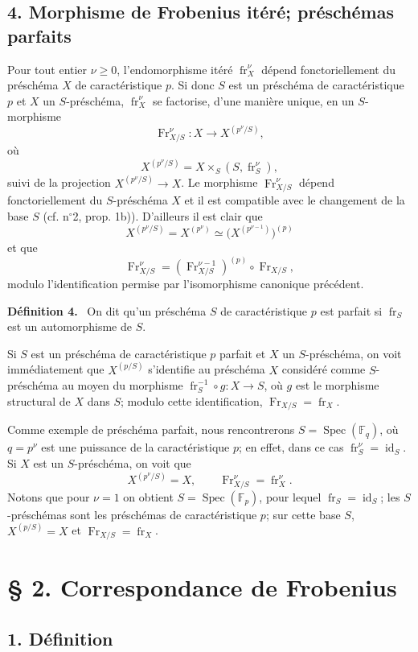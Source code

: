 \documentclass[11pt]{article}
\newenvironment{statement}[1]{\par\medskip\noindent\textbf{#1.}\ }{\par\medskip}
\DeclareMathOperator{\Spec}{Spec}
\providecommand{\id}{\operatorname{id}}
\providecommand{\id}{\operatorname{id}}
\providecommand{\id}{\operatorname{id}}
\providecommand{\id}{\operatorname{id}}
\providecommand{\Spec}{\operatorname{Spec}}
\providecommand{\Spec}{\operatorname{Spec}}
\providecommand{\id}{\operatorname{id}}
\providecommand{\Spec}{\operatorname{Spec}}
\providecommand{\fr}{\operatorname{fr}}
\providecommand{\Fr}{\operatorname{Fr}}
\providecommand{\Fr}{\operatorname{Fr}}
\providecommand{\fr}{\operatorname{fr}}
\providecommand{\Spec}{\operatorname{Spec}}
\providecommand{\id}{\operatorname{id}}
\begin{document}
\subsection*{4. Morphisme de Frobenius itéré; préschémas parfaits}

Pour tout entier $\nu\geq 0$, l'endomorphisme itéré $\fr_X^\nu$ dépend fonctoriellement du préschéma $X$ de caractéristique $p$. Si donc $S$ est un préschéma de caractéristique $p$ et $X$ un $S$-préschéma, $\fr_X^\nu$ se factorise, d'une manière unique, en un $S$-morphisme
\[
\Fr_{X/S}^\nu:X\longrightarrow X^{(p^\nu/S)},
\]
où
\[
X^{(p^\nu/S)}=X\times_S(S,\fr_S^\nu),
\]
suivi de la projection $X^{(p^\nu/S)}\to X$. Le morphisme $\Fr_{X/S}^\nu$ dépend fonctoriellement du $S$-préschéma $X$ et il est compatible avec le changement de la base $S$ (cf. n$^\circ$2, prop. 1b)). D'ailleurs il est clair que
\[
X^{(p^\nu/S)}=X^{(p^\nu)}\simeq\bigl(X^{(p^{\nu-1})}\bigr)^{(p)}
\]
et que
\[
\Fr_{X/S}^\nu=(\Fr_{X/S}^{\nu-1})^{(p)}\circ\Fr_{X/S},
\]
modulo l'identification permise par l'isomorphisme canonique précédent.

\begin{statement}{Définition 4}
On dit qu'un préschéma $S$ de caractéristique $p$ est parfait si $\fr_S$ est un automorphisme de $S$.
\end{statement}

Si $S$ est un préschéma de caractéristique $p$ parfait et $X$ un $S$-préschéma, on voit immédiatement que $X^{(p/S)}$ s'identifie au préschéma $X$ considéré comme $S$-préschéma au moyen du morphisme $\fr_S^{-1}\circ g:X\to S$, où $g$ est le morphisme structural de $X$ dans $S$; modulo cette identification, $\Fr_{X/S}=\fr_X$.

Comme exemple de préschéma parfait, nous rencontrerons $S=\Spec(\mathbb F_q)$, où $q=p^\nu$ est une puissance de la caractéristique $p$; en effet, dans ce cas $\fr_S^\nu=\id_S$. Si $X$ est un $S$-préschéma, on voit que
\[
X^{(p^\nu/S)}=X,
\qquad
\Fr_{X/S}^\nu=\fr_X^\nu.
\]
Notons que pour $\nu=1$ on obtient $S=\Spec(\mathbb F_p)$, pour lequel $\fr_S=\id_S$; les $S$-préschémas sont les préschémas de caractéristique $p$; sur cette base $S$, $X^{(p/S)}=X$ et $\Fr_{X/S}=\fr_X$.

\section*{§ 2. Correspondance de Frobenius}

\subsection*{1. Définition}
\end{document}
